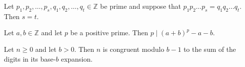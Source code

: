 \begin{chapex} %
Let $p_1, p_2, \dots, p_s, q_1, q_2, \dots, q_t \in \mathbb{Z}$ be prime and suppose that $p_1p_2 \dots p_s = q_1 q_2 \dots q_t$. Then $s=t$.
\end{chapex}

\begin{chapex} %
Let $a,b \in \mathbb{Z}$ and let $p$ be a positive prime. Then $p \mid (a+b)^p-a-b$.
\end{chapex}

\begin{chapex} %
\label{cqNumberTheoryASNEnd}
Let $n \ge 0$ and let $b>0$. Then $n$ is congruent modulo $b-1$ to the sum of the digits in its base-$b$ expansion.
\end{chapex}